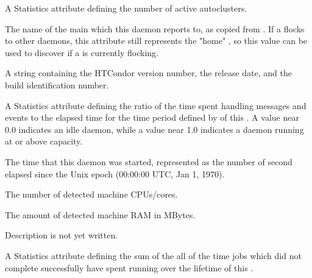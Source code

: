 \begin{description}

\item[\AdAttr{Autoclusters}:] A Statistics attribute defining
  the number of active autoclusters.

\item[\AdAttr{CollectorHost}:] The name of the main 
  which this  daemon reports to,
  as copied from .  
  If a  flocks to other  daemons,
  this attribute still represents the "home" ,
  so this value can be used to discover if a  
  is currently flocking.

\item[\AdAttr{CondorVersion}:] A string containing the HTCondor version
number, the release date, and the build identification number.

\item[\AdAttr{DaemonCoreDutyCycle}:] A Statistics attribute defining
  the ratio of the time spent handling 
  messages and events to the elapsed time for the time period defined by
   of this .
  A value near 0.0 indicates an idle daemon, 
  while a value near 1.0 indicates a daemon running at or above capacity.

\item[\AdAttr{DaemonStartTime}:] The time that this daemon was
  started, represented as the number of second elapsed since
    the Unix epoch (00:00:00 UTC, Jan 1, 1970).

\item[\AdAttr{DetectedCpus}:] The number of detected machine CPUs/cores.

\item[\AdAttr{DetectedMemory}:] The amount of detected machine RAM in MBytes.

\item[\AdAttr{JobQueueBirthdate}:] Description is not yet written.

\item[\AdAttr{JobsAccumBadputTime}:] A Statistics attribute defining
  the sum of the all of the time jobs which did not complete successfully 
  have spent running over the lifetime of this .


\end{description}
